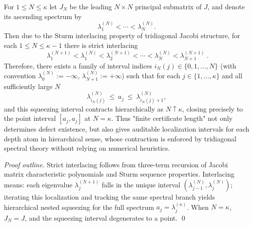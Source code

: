 \begin{proposition}\label{prop:xi-jacobi-sturm-nested-localization}
For \(1\le N\le \kappa\) let \(J_N\) be the leading \(N\times N\) principal submatrix of \(J\), and denote its ascending spectrum by
\[
\lambda^{(N)}_1<\cdots<\lambda^{(N)}_N.
\]
Then due to the Sturm interlacing property of tridiagonal Jacobi structure, for each \(1\le N\le \kappa-1\) there is strict interlacing
\[
\boxed{\;
\lambda^{(N+1)}_1<\lambda^{(N)}_1<\lambda^{(N+1)}_2<\cdots<
\lambda^{(N)}_N<\lambda^{(N+1)}_{N+1}\; }.
\]
Therefore, there exists a family of interval indices \(i_N(j)\in\{0,1,\dots,N\}\) (with convention \(\lambda^{(N)}_0:=-\infty\), \(\lambda^{(N)}_{N+1}:=+\infty\)) such that for each \(j\in\{1,\dots,\kappa\}\) and all sufficiently large \(N\)
\[
\lambda^{(N)}_{i_N(j)}\ \le\ a_j\ \le\ \lambda^{(N)}_{i_N(j)+1},
\]
and this squeezing interval contracts hierarchically as \(N\uparrow \kappa\), closing precisely to the point interval \([a_j,a_j]\) at \(N=\kappa\).
Thus "finite certificate length" not only determines defect existence, but also gives auditable localization intervals for each depth atom in hierarchical sense, whose contraction is enforced by tridiagonal spectral theory without relying on numerical heuristics.
\end{proposition}
\begin{proof}[Proof outline]
Strict interlacing follows from three-term recursion of Jacobi matrix characteristic polynomials and Sturm sequence properties.
Interlacing means: each eigenvalue \(\lambda^{(N+1)}_j\) falls in the unique interval \((\lambda^{(N)}_{j-1},\lambda^{(N)}_{j})\);
iterating this localization and tracking the same spectral branch yields hierarchical nested squeezing for the full spectrum \(a_j=\lambda^{(\kappa)}_j\).
When \(N=\kappa\), \(J_N=J\), and the squeezing interval degenerates to a point. \qed
\end{proof}

